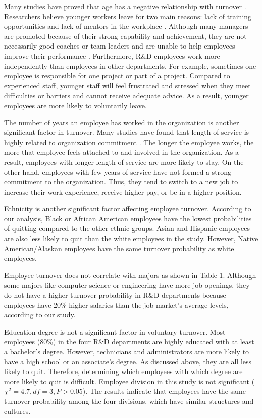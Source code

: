 Many studies have proved that age has a negative relationship with turnover \citep{rhodes1983}. Researchers believe younger workers leave for two main reasons: lack of training opportunities and lack of mentors in the workplace \citep{paul2012}. Although many managers are promoted because of their strong capability and achievement, they are not necessarily good coaches or team leaders and are unable to help employees improve their performance \citep{smith2009}. Furthermore, R\&D employees work more independently than employees in other departments. For example, sometimes one employee is responsible for one project or part of a project. Compared to experienced staff, younger staff will feel frustrated and stressed when they meet difficulties or barriers and cannot receive adequate advice. As a result, younger employees are more likely to voluntarily leave.  

The number of years an employee has worked in the organization is another significant factor in turnover. Many studies have found that length of service is highly related to organization commitment \citep{Jena2015, Kelarijani2014, Popoola2006}. The longer the employee works, the more that employee feels attached to and involved in the organization. As a result, employees with longer length of service are more likely to stay. On the other hand, employees with few years of service have not formed a strong commitment to the organization. Thus, they tend to switch to a new job to increase their work experience, receive higher pay, or be in a higher position.

Ethnicity is another significant factor affecting employee turnover. According to our analysis, Black or African American employees have the lowest probabilities of quitting compared to the other ethnic groups. Asian and Hispanic employees are also less likely to quit than the white employees in the study. However, Native American/Alaskan employees have the same turnover probability as white employees.   

Employee turnover does not correlate with majors as shown in Table 1. Although some majors like computer science or engineering have more job openings, they do not have a higher turnover probability in R\&D departments because employees have 20\% higher salaries than the job market's average levels, according to our study. 

Education degree is not a significant factor in voluntary turnover. Most employees (80\%) in the four R\&D departments are highly educated with at least a bachelor's degree. However, technicians and administrators are more likely to have a high school or an associate's degree. As discussed above, they are all less likely to quit. Therefore, determining which employees with which degree are more likely to quit is difficult.
Employee division in this study is not significant ($\chi^2=4.7, df=3, P > 0.05$). The results indicate that employees have the same turnover probability among the four divisions, which have similar structures and cultures. 
 
